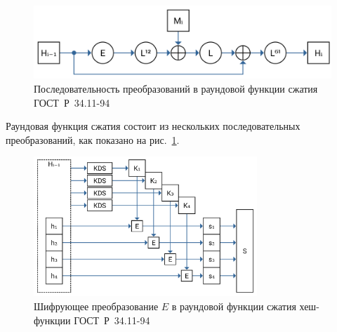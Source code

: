 \begin{figure}[htb]
    \centering
    \includegraphics[width=\textwidth]{pic/gost-94-elxlxl}
    \caption{Последовательность преобразований в раундовой функции сжатия ГОСТ~Р~34.11-94}
    \label{fig:gost-94-elxlxl}
\end{figure}

Раундовая функция сжатия состоит из нескольких последовательных преобразований, как показано на рис.~\ref{fig:gost-94-elxlxl}.

\begin{figure}[htb]
    \centering
    \includegraphics[width=0.75\textwidth]{pic/gost-94-encrypt}
    \caption{Шифрующее преобразование $E$ в раундовой функции сжатия хеш-функции ГОСТ~Р~34.11-94}
    \label{fig:gost-94-encrypt}
\end{figure}

